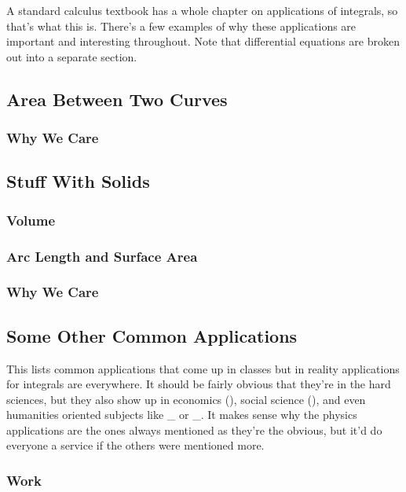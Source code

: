 A standard calculus textbook has a whole chapter on applications of integrals, so that's what this is. There's a few examples of why these applications are important and interesting throughout. Note that differential equations are broken out into a separate section.

\subsection{Area Between Two Curves}

\subsubsection{Why We Care}

\subsection{Stuff With Solids}

\subsubsection{Volume}

\subsubsection{Arc Length and Surface Area}

\subsubsection{Why We Care}

\subsection{Some Other Common Applications}

This lists common applications that come up in classes but in reality applications for integrals are everywhere. It should be fairly obvious that they're in the hard sciences, but they also show up in economics (), social science (), and even humanities oriented subjects like \_ or \_. It makes sense why the physics applications are the ones always mentioned as they're the obvious, but it'd do everyone a service if the others were mentioned more.

\subsubsection{Work}